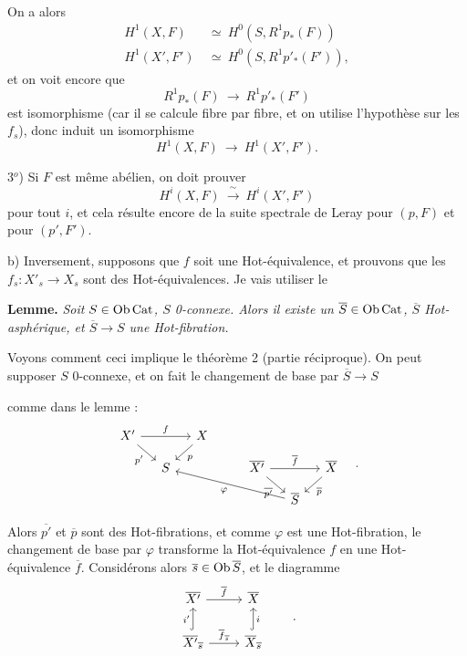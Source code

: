 

On a alors
\[
\begin{aligned}
H^1(X,F) &\ \simeq\ H^0(S, R^1p_*(F)) \\
H^1(X',F') &\ \simeq\ H^0(S, R^1p'_*(F')),
\end{aligned}
\]
et on voit encore que
\[
R^1p_*(F) \ \longrightarrow\ R^1p'_*(F')
\]
est isomorphisme (car il se calcule fibre par fibre, et on utilise l'hypothèse sur les $f_s$), donc induit un isomorphisme
\[
H^1(X,F) \ \longrightarrow\ H^1(X',F').
\]

3$^{o}$) Si $F$ est même abélien, on doit prouver
\[
H^i(X,F) \ \xrightarrow{\ \sim\ }\ H^i(X',F')
\]
pour tout $i$, et cela résulte encore de la suite spectrale de Leray pour $(p,F)$ et pour $(p',F')$.

b) Inversement, supposons que $f$ soit une Hot-équivalence, et prouvons que les $f_s : X'_s \longrightarrow X_s$ sont des Hot-équivalences. Je vais utiliser le

\textbf{Lemme.} \textit{Soit $S \in \operatorname{Ob}\mathrm{Cat}$, $S$ \textup{0}-connexe. Alors il existe un $\overline{S} \in \operatorname{Ob}\mathrm{Cat}$, $\overline{S}$ \textup{Hot}-asphérique, et $\overline{S} \longrightarrow S$ une \textup{Hot}-fibration.}

Voyons comment ceci implique le théorème 2 (partie réciproque). On peut supposer $S$ 0-connexe, et on fait le changement de base par $\overline{S} \longrightarrow S$


comme dans le lemme :
\[
\begin{tikzcd}[column sep=small, row sep=small]
X' \arrow[rr, "f"] \arrow[dr, "p'"'] & & X \arrow[dl, "p"] & & & & \\
& S & & & \overline{X'} \arrow[rr, "\overline{f}"] \arrow[dr, "\overline{p'}"'] & & \overline{X} \arrow[dl, "\overline{p}"] \\
& & & & & \overline{S} \arrow[ullll, "\varphi"] &
\end{tikzcd}
\quad .
\]

Alors $\overline{p'}$ et $\overline{p}$ sont des Hot-fibrations, et comme $\varphi$ est une Hot-fibration, le changement de base par $\varphi$ transforme la Hot-équivalence $f$ en une Hot-équivalence $\overline{f}$. Considérons alors $\overline{s} \in \operatorname{Ob}\overline{S}$, et le diagramme
\[
\begin{tikzcd}
\overline{X'} \arrow[r, "\overline{f}"] & \overline{X} \\
\overline{X'}_{\overline{s}} \arrow[u, hook, "i'"] \arrow[r, "\overline{f}_{\overline{s}}"] & \overline{X}_{\overline{s}} \arrow[u, hook, "i"']
\end{tikzcd}
\qquad .
\]

